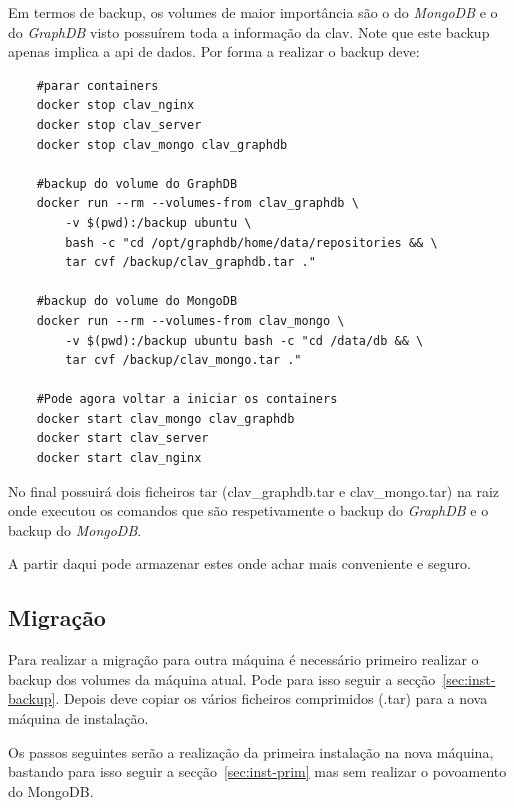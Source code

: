 Em termos de backup, os volumes de maior importância são o do \textit{MongoDB} e o do \textit{GraphDB} visto possuírem toda a informação da \acrshort{clav}. Note que este backup apenas implica a \acrshort{api} de dados. Por forma a realizar o backup deve:
\begin{verbatim}
    #parar containers
    docker stop clav_nginx
    docker stop clav_server
    docker stop clav_mongo clav_graphdb
    
    #backup do volume do GraphDB
    docker run --rm --volumes-from clav_graphdb \
        -v $(pwd):/backup ubuntu \
        bash -c "cd /opt/graphdb/home/data/repositories && \
        tar cvf /backup/clav_graphdb.tar ."
        
    #backup do volume do MongoDB
    docker run --rm --volumes-from clav_mongo \
        -v $(pwd):/backup ubuntu bash -c "cd /data/db && \
        tar cvf /backup/clav_mongo.tar ."
        
    #Pode agora voltar a iniciar os containers
    docker start clav_mongo clav_graphdb
    docker start clav_server
    docker start clav_nginx
\end{verbatim}

No final possuirá dois ficheiros tar (clav\_graphdb.tar e clav\_mongo.tar) na raiz onde executou os comandos que são respetivamente o backup do \textit{GraphDB} e o backup do \textit{MongoDB}.

A partir daqui pode armazenar estes onde achar mais conveniente e seguro.

\subsection{Migração}

Para realizar a migração para outra máquina é necessário primeiro realizar o backup dos volumes da máquina atual. Pode para isso seguir a secção~\ref{sec:inst-backup}. Depois deve copiar os vários ficheiros comprimidos (.tar) para a nova máquina de instalação.

Os passos seguintes serão a realização da primeira instalação na nova máquina, bastando para isso seguir a secção~\ref{sec:inst-prim} mas sem realizar o povoamento do MongoDB.

